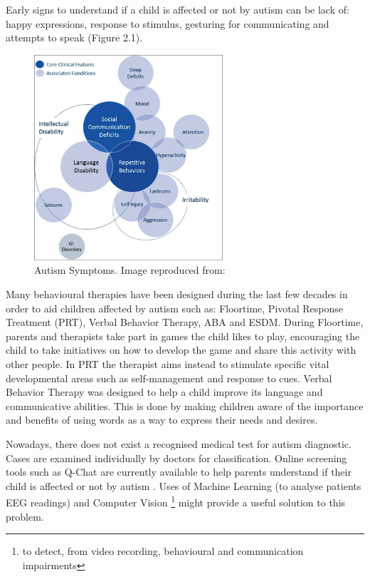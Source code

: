 Early signs to understand if a child is affected or not by autism can be lack of: happy expressions, response to stimulus, gesturing for communicating and attempts to speak \cite{signs} (Figure 2.1).

\begin{figure}[ht!]%
    \centering
    \includegraphics[width=7cm]{images/Autisms.png}%
    \caption{Autism Symptoms. Image reproduced from: \cite{symptoms}}%
\end{figure}


Many behavioural therapies have been designed during the last few decades in order to aid children affected by autism such as: Floortime, Pivotal Response Treatment (PRT), Verbal Behavior Therapy, ABA and ESDM. During Floortime, parents and therapists take part in games the child likes to play, encouraging the child to take initiatives on how to develop the game and share this activity with other people. In PRT the therapist aims instead to stimulate specific vital developmental areas such as self-management and response to cues. Verbal Behavior Therapy was designed to help a child improve its language and communicative abilities. This is done by making children aware of the importance and benefits of using words as a way to express their needs and desires. 

Nowadays, there does not exist a recognised medical test for autism diagnostic. Cases are examined individually by doctors for classification. Online screening tools such as Q-Chat are currently available to help parents understand if their child is affected or not by autism \cite{screening}. Uses of Machine Learning (to analyse patients EEG readings) and Computer Vision \footnote{to detect, from video recording, behavioural and communication impairments} might provide a useful solution to this problem. 

